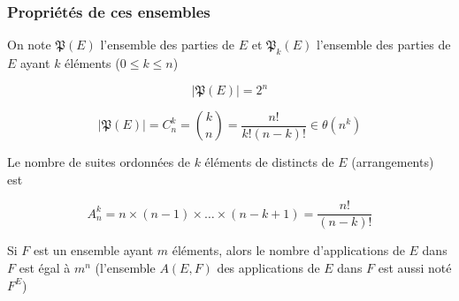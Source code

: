 \documentclass[aspectratio=1610,francais,envcountsect]{beamer}
\begin{document}
\begin{frame}
  \frametitle{Propriétés de ces ensembles}

  On note $\mathfrak{P}(E)$ l'ensemble des parties de $E$ et
  $\mathfrak{P}_k(E)$ l'ensemble des parties de $E$ ayant $k$ éléments
  ($0 \leq k \leq n$)
  
  \begin{equation}
    |\mathfrak{P}(E)|=2^n\label{eq:1}
  \end{equation}
  
  \begin{equation}
    |\mathfrak{P}(E)| = C^k_n = \binom{k}{n} = \frac{n!}{k!(n - k )!} \in \theta(n^k)  \label{eq:2}
  \end{equation}

  Le nombre de suites ordonnées de $k$ éléments de distincts de $E$
  (arrangements) est

\begin{equation}
  A_n^k =n \times (n - 1) \times \ldots  \times (n - k+1) = \frac{n!}{(n - k)!}
\end{equation}

\bigskip

Si $F$ est un ensemble ayant $m$ éléments, alors le nombre
d'applications de $E$ dans $F$ est égal à $m^n$ (l'ensemble $A(E, F)$
des applications de $E$ dans $F$ est aussi noté $F^E$)
\end{frame}
\end{document}
